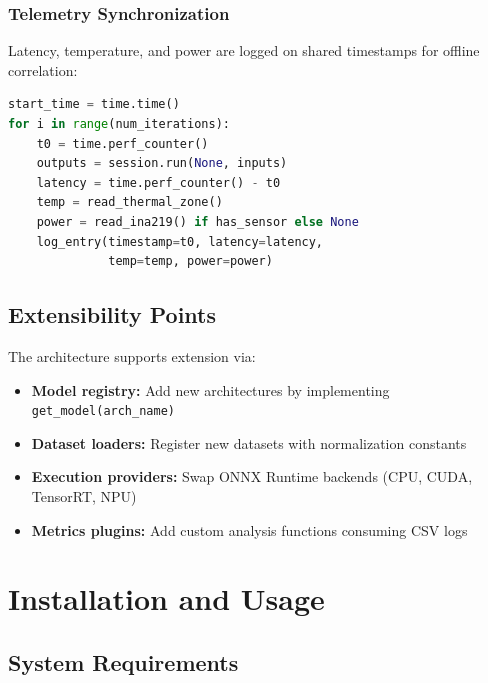 \documentclass[review]{elsarticle}
\begin{document}
\subsubsection{Telemetry Synchronization}

Latency, temperature, and power are logged on shared timestamps for offline correlation:

\begin{lstlisting}[language=Python,caption={Synchronized telemetry collection}]
start_time = time.time()
for i in range(num_iterations):
    t0 = time.perf_counter()
    outputs = session.run(None, inputs)
    latency = time.perf_counter() - t0
    temp = read_thermal_zone()
    power = read_ina219() if has_sensor else None
    log_entry(timestamp=t0, latency=latency, 
              temp=temp, power=power)
\end{lstlisting}

\subsection{Extensibility Points}

The architecture supports extension via:

\begin{itemize}
\item \textbf{Model registry:} Add new architectures by implementing \texttt{get\_model(arch\_name)}
\item \textbf{Dataset loaders:} Register new datasets with normalization constants
\item \textbf{Execution providers:} Swap ONNX Runtime backends (CPU, CUDA, TensorRT, NPU)
\item \textbf{Metrics plugins:} Add custom analysis functions consuming CSV logs
\end{itemize}

\section{Installation and Usage}
\label{sec:installation}

\subsection{System Requirements}
\end{document}
